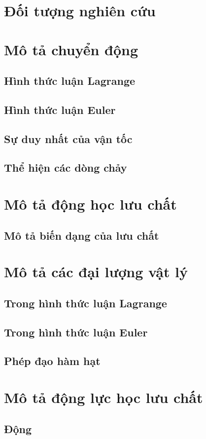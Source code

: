 \documentclass[../../main.tex]{subfiles}
\begin{document}
\section{Đối tượng nghiên cứu}
	
\section{Mô tả chuyển động}
	\subsection{Hình thức luận Lagrange}
		
	\subsection{Hình thức luận Euler}
		
	\subsection{Sự duy nhất của vận tốc}
		
	\subsection{Thể hiện các dòng chảy}
		
\section{Mô tả động học lưu chất}
	\subsection{Mô tả biến dạng của lưu chất}
		
\section{Mô tả các đại lượng vật lý}
	\subsection{Trong hình thức luận Lagrange}
		
	\subsection{Trong hình thức luận Euler}
		
	\subsection{Phép đạo hàm hạt}
		
\section{Mô tả động lực học lưu chất}
	\subsection{Động }
\end{document}
